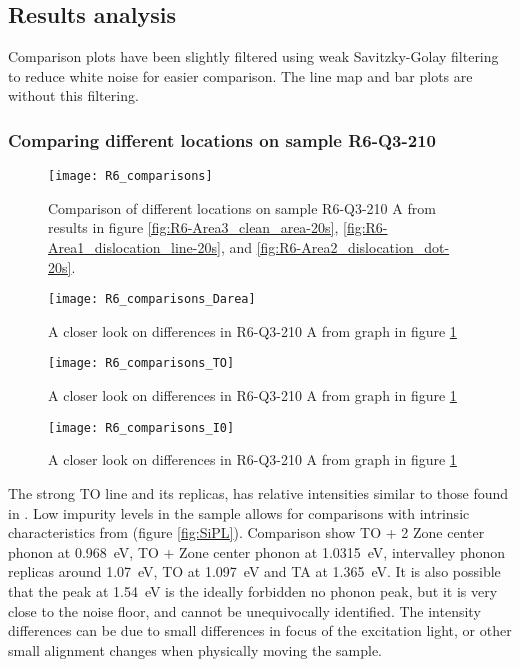 \subsection{Results analysis}

Comparison plots have been slightly filtered using weak Savitzky-Golay filtering to reduce white noise for easier comparison. The line map and bar plots are without this filtering.

\subsubsection{Comparing different locations on sample R6-Q3-210}


\begin{figure}[H]
\centering
\texttt{[image: R6\_comparisons]}
\caption[R6-Q3-210 comparisons]{Comparison of different locations on sample R6-Q3-210 A from results in figure \ref{fig:R6-Area3_clean_area-20s}, \ref{fig:R6-Area1_dislocation_line-20s}, and \ref{fig:R6-Area2_dislocation_dot-20s}.}
\label{fig:R6_comparisons}%
\end{figure}

\begin{figure}[H]
\centering
\texttt{[image: R6\_comparisons\_Darea]}
\caption[R6-Q3-210 comparisons close]{A closer look on differences in R6-Q3-210 A from graph in figure \ref{fig:R6_comparisons} }
\label{fig:R6_comparisons_Darea}%
\end{figure}

\begin{figure}[H]
\centering
\texttt{[image: R6\_comparisons\_TO]}
\caption[R6-Q3-210 comparisons close]{A closer look on differences in R6-Q3-210 A from graph in figure \ref{fig:R6_comparisons} }
\label{fig:R6_comparisons_TO}%
\end{figure}

\begin{figure}[H]
\centering
\texttt{[image: R6\_comparisons\_I0]}
\caption[R6-Q3-210 comparisons close]{A closer look on differences in R6-Q3-210 A from graph in figure \ref{fig:R6_comparisons} }
\label{fig:R6_comparisons_I0}%
\end{figure}


The strong TO line and its replicas, has relative intensities similar to those found in \cite{dean67}. Low impurity levels  in the sample allows for comparisons with intrinsic characteristics from \cite{dean67} (figure \ref{fig:SiPL}). Comparison show TO + 2 Zone center phonon at 0.968~eV, TO + Zone center phonon at 1.0315~eV, intervalley phonon replicas around 1.07~eV, TO at 1.097~eV and TA at 1.365~eV. It is also possible that the peak at 1.54~eV is the ideally forbidden no phonon peak, but it is very close to the noise floor, and cannot be unequivocally identified. The intensity differences can be due to small differences in focus of the excitation light, or other small alignment changes when physically moving the sample.


